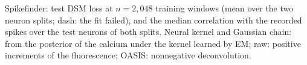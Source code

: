 \documentclass{article}
\begin{document}
\begin{table}[!htbp]
  \caption{Spikefinder: test DSM loss at $n=2{,}048$ training windows (mean over the two neuron splits; dash: the fit
  failed), and the median correlation with the recorded spikes over the test neurons of both splits. Neural kernel and
  Gaussian chain: from the posterior of the calcium under the kernel learned by EM; raw: positive increments of the
  fluorescence; OASIS: nonnegative deconvolution.}
  \label{tab:calcium-real}
  \centering
  \small
  \setlength{\tabcolsep}{4pt}
  
\end{table}
\end{document}
